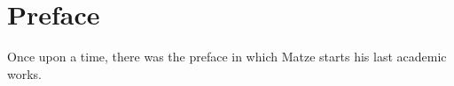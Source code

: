 \begingroup
\newpage
\section{Preface} 
Once upon a time, there was the preface in which Matze starts his last
academic works.
\endgroup
